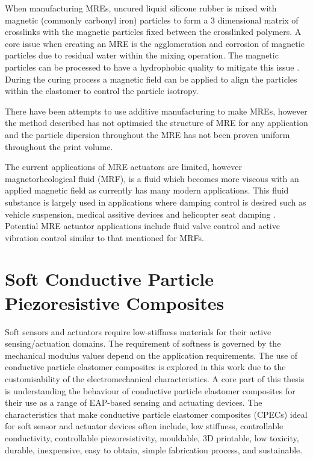 When manufacturing MREs, uncured liquid silicone rubber is mixed with magnetic (commonly carbonyl iron) particles to form a 3 dimensional matrix of crosslinks with the magnetic particles fixed between the crosslinked polymers. A core issue when creating an MRE is the agglomeration and corrosion of magnetic particles due to residual water within the mixing operation. The magnetic particles can be processed to have a hydrophobic quality to mitigate this issue \cite{Burhannuddin2020,Ge2020}. During the curing process a magnetic field can be applied to align the particles within the elastomer to control the particle isotropy\cite{Ge2020,LaleganiDezaki2023}.

There have been attempts to use additive manufacturing to make MREs\citep{Krueger2014,Ge2020}, however the method described has not optimsied the structure of MRE for any application and the particle dipersion throughout the MRE has not been proven uniform throughout the print volume.

The current applications of MRE actuators are limited, however magnetorheological fluid (MRF), is a fluid which becomes more viscous with an applied magnetic field as currently has many modern applications. This fluid substance is largely used in applications where damping control is desired such as vehicle suspension\citep{UnuhH2019}, medical assitive devices\citep{Chen2017} and helicopter seat damping \citep{Hiemenz2007}. Potential MRE actuator applications include fluid valve control\citep{Bose2012} and active vibration control similar to that mentioned for MRFs\citep{UnuhH2019}.



\section{Soft Conductive Particle Piezoresistive Composites}
\label{sec:Soft Piezoresistive Composites}
Soft sensors and actuators require low-stiffness materials for their active sensing/actuation domains. The requirement of softness is governed by the mechanical modulus values depend on the application requirements. The use of conductive particle elastomer composites is explored in this work due to the customisability of the electromechanical characteristics.
A core part of this thesis is understanding the behaviour of conductive particle elastomer composites for their use as a range of EAP-based sensing and actuating devices. The characteristics that make conductive particle elastomer composites (CPECs) ideal for soft sensor and actuator devices often include, low stiffness, controllable conductivity, controllable piezoresistivity, mouldable, 3D printable, low toxicity, durable, inexpensive, easy to obtain, simple fabrication process, and sustainable\cite{Chung2020,Ge2020,HindermannBischoff2001,Kim2012}.

